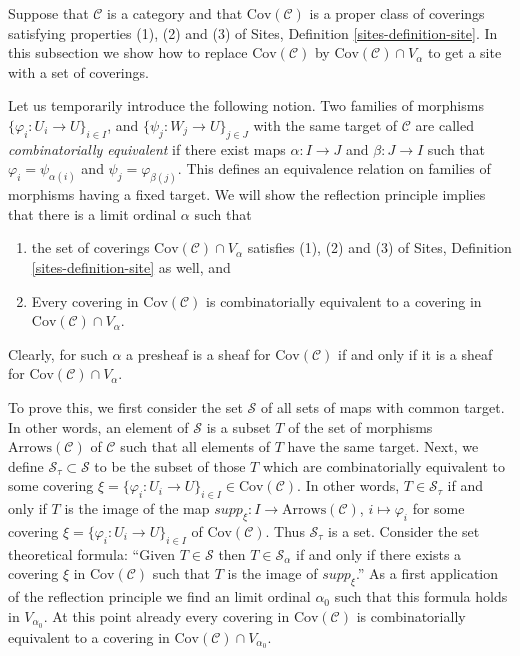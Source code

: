 \noindent
Suppose that $\mathcal{C}$ is a category and
that $\text{Cov}(\mathcal{C})$ is a proper class of coverings
satisfying properties (1), (2) and (3) of Sites,
Definition \ref{sites-definition-site}.
In this subsection we show how to replace $\text{Cov}(\mathcal{C})$
by $\text{Cov}(\mathcal{C}) \cap V_\alpha$ to get a site
with a set of coverings.

\medskip\noindent
Let us temporarily introduce the following notion.
Two families of morphisms $\{\varphi_i : U_i \to U\}_{i\in I}$, and
$\{\psi_j : W_j \to U\}_{j\in J}$ with the same target of $\mathcal{C}$ are
called {\it combinatorially equivalent} if there exist maps
$\alpha : I \to J$ and $\beta : J\to I$ such that
$\varphi_i = \psi_{\alpha(i)}$ and $\psi_j = \varphi_{\beta(j)}$.
This defines an equivalence relation on families of morphisms
having a fixed target.
We will show the reflection principle implies that there is a limit ordinal
$\alpha$ such that
\begin{enumerate}
\item the set of coverings
$\text{Cov}(\mathcal{C}) \cap V_\alpha$ satisfies
(1), (2) and (3) of Sites, Definition \ref{sites-definition-site}
as well, and
\item Every covering in $\text{Cov}(\mathcal{C})$
is combinatorially equivalent
to a covering in $\text{Cov}(\mathcal{C}) \cap V_\alpha$.
\end{enumerate}
Clearly, for such $\alpha$ a presheaf is a sheaf for $\text{Cov}(\mathcal{C})$
if and only if it is a sheaf for $\text{Cov}(\mathcal{C}) \cap V_\alpha$.

\medskip\noindent
To prove this, we first consider the set $\mathcal{S}$ of all sets of maps
with common target. In other words, an element of
$\mathcal{S}$ is a subset $T$ of the set of morphisms 
$\text{Arrows}(\mathcal{C})$ of $\mathcal{C}$ such that all
elements of $T$ have the same target. Next, we define
$\mathcal{S}_\tau \subset \mathcal{S}$ to be the subset of those
$T$ which are combinatorially equivalent to some covering
$\xi = \{\varphi_i : U_i \to U\}_{i\in I} \in \text{Cov}(\mathcal{C})$.
In other words, $T \in \mathcal{S}_\tau$ if and only if $T$
is the image of the map $supp_\xi : I \to \text{Arrows}(\mathcal{C})$,
$i\mapsto \varphi_i$ for some covering
$\xi = \{\varphi_i : U_i \to U\}_{i\in I}$
of $\text{Cov}(\mathcal{C})$. Thus $\mathcal{S}_\tau$
is a set. Consider the set theoretical formula: ``Given $T \in \mathcal{S}$
then $T\in \mathcal{S}_\alpha$ if and only if there exists
a covering $\xi$ in $\text{Cov}(\mathcal{C})$ such that
$T$ is the image of $supp_\xi$.'' As a first application of the
reflection principle we find an limit ordinal $\alpha_0$ such that
this formula holds in $V_{\alpha_0}$. At this point already every
covering in $\text{Cov}(\mathcal{C})$ is combinatorially equivalent
to a covering in $\text{Cov}(\mathcal{C}) \cap V_{\alpha_0}$.

